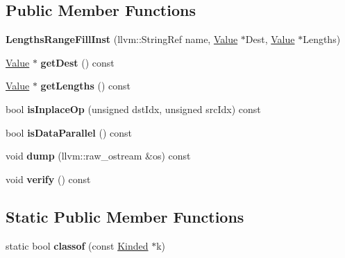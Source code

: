 \subsection*{Public Member Functions}
\begin{DoxyCompactItemize}
\item 
\mbox{\label{classglow_1_1_lengths_range_fill_inst_a271d0ab840e4991d80f17d5d444f05d8}} 
{\bfseries Lengths\+Range\+Fill\+Inst} (llvm\+::\+String\+Ref name, \hyperlink{classglow_1_1_value}{Value} $\ast$Dest, \hyperlink{classglow_1_1_value}{Value} $\ast$Lengths)
\item 
\mbox{\label{classglow_1_1_lengths_range_fill_inst_a24c7b75b1d5abdfceb9c58c78a62d73e}} 
\hyperlink{classglow_1_1_value}{Value} $\ast$ {\bfseries get\+Dest} () const
\item 
\mbox{\label{classglow_1_1_lengths_range_fill_inst_a2c26910ecaa460e7cf5cf9403821c1cd}} 
\hyperlink{classglow_1_1_value}{Value} $\ast$ {\bfseries get\+Lengths} () const
\item 
\mbox{\label{classglow_1_1_lengths_range_fill_inst_a03f8058de0761d8731572fe608e7f1d9}} 
bool {\bfseries is\+Inplace\+Op} (unsigned dst\+Idx, unsigned src\+Idx) const
\item 
\mbox{\label{classglow_1_1_lengths_range_fill_inst_ac54be477de18f9bff436f2d433d22e17}} 
bool {\bfseries is\+Data\+Parallel} () const
\item 
\mbox{\label{classglow_1_1_lengths_range_fill_inst_a51aafa2c5b0a1078d1abc36f9494972c}} 
void {\bfseries dump} (llvm\+::raw\+\_\+ostream \&os) const
\item 
\mbox{\label{classglow_1_1_lengths_range_fill_inst_adb9a1db453b8e903e7344c81d8918be0}} 
void {\bfseries verify} () const
\end{DoxyCompactItemize}
\subsection*{Static Public Member Functions}
\begin{DoxyCompactItemize}
\item 
\mbox{\label{classglow_1_1_lengths_range_fill_inst_ab562f96fd0d0fdbf7036e867e8c065fe}} 
static bool {\bfseries classof} (const \hyperlink{classglow_1_1_kinded}{Kinded} $\ast$k)
\end{DoxyCompactItemize}

